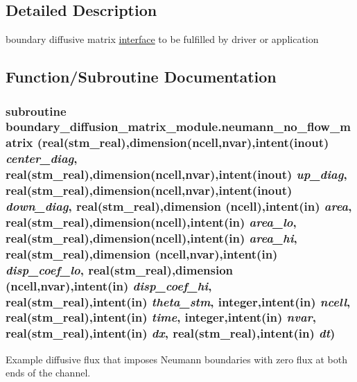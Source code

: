 \subsection{Detailed Description}
boundary diffusive matrix \hyperlink{a00003}{interface} to be fulfilled by driver or application 



\subsection{Function/Subroutine Documentation}
\hypertarget{a00055_bfeec91e611887da43beb5b8a58614fc}{
\subsubsection[{neumann\_\-no\_\-flow\_\-matrix}]{\setlength{\rightskip}{0pt plus 5cm}subroutine boundary\_\-diffusion\_\-matrix\_\-module.neumann\_\-no\_\-flow\_\-matrix (real(stm\_\-real),dimension(ncell,nvar),intent(inout) {\em center\_\-diag}, \/  real(stm\_\-real),dimension(ncell,nvar),intent(inout) {\em up\_\-diag}, \/  real(stm\_\-real),dimension(ncell,nvar),intent(inout) {\em down\_\-diag}, \/  real(stm\_\-real),dimension (ncell),intent(in) {\em area}, \/  real(stm\_\-real),dimension(ncell),intent(in) {\em area\_\-lo}, \/  real(stm\_\-real),dimension(ncell),intent(in) {\em area\_\-hi}, \/  real(stm\_\-real),dimension (ncell,nvar),intent(in) {\em disp\_\-coef\_\-lo}, \/  real(stm\_\-real),dimension (ncell,nvar),intent(in) {\em disp\_\-coef\_\-hi}, \/  real(stm\_\-real),intent(in) {\em theta\_\-stm}, \/  integer,intent(in) {\em ncell}, \/  real(stm\_\-real),intent(in) {\em time}, \/  integer,intent(in) {\em nvar}, \/  real(stm\_\-real),intent(in) {\em dx}, \/  real(stm\_\-real),intent(in) {\em dt})}}
\label{a00055_bfeec91e611887da43beb5b8a58614fc}


Example diffusive flux that imposes Neumann boundaries with zero flux at both ends of the channel. 

